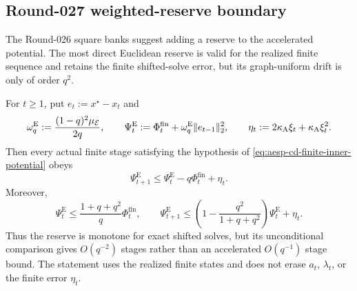 \subsection{Round-027 weighted-reserve boundary}

The Round-026 square banks suggest adding a reserve to the accelerated
potential.  The most direct Euclidean reserve is valid for the realized finite
sequence and retains the finite shifted-solve error, but its graph-uniform
drift is only of order $q^2$.

\begin{lemma}
\label{lem:aesp-cd-q-weighted-euclidean-reserve}
For $t\geq1$, put $e_t:=x^\star-x_t$ and
\begin{equation*}
 \omega_q^{\mathrm E}
 :=\frac{(1-q)^2\mu_{\mathcal E}}{2q},
 \qquad
 \Psi_t^{\mathrm E}
 :=\Phi_t^{\mathrm{fin}}
   +\omega_q^{\mathrm E}\lVert e_{t-1}\rVert_2^2,
 \qquad
 \eta_t:=2\kappa_{\mathrm A}\xi_t
          +\kappa_{\mathrm A}\xi_t^2.
\end{equation*}
Then every actual finite stage satisfying the hypothesis of
\cref{eq:aesp-cd-finite-inner-potential} obeys
\begin{equation}
 \Psi_{t+1}^{\mathrm E}
 \leq \Psi_t^{\mathrm E}-q\Phi_t^{\mathrm{fin}}+\eta_t.
 \label{eq:aesp-cd-q-weighted-euclidean-reserve}
\end{equation}
Moreover,
\begin{equation}
 \Psi_t^{\mathrm E}
 \leq\frac{1+q+q^2}{q}\Phi_t^{\mathrm{fin}},
 \qquad
 \Psi_{t+1}^{\mathrm E}
 \leq
 \left(1-\frac{q^2}{1+q+q^2}\right)\Psi_t^{\mathrm E}
 +\eta_t.
 \label{eq:aesp-cd-q-weighted-euclidean-drift}
\end{equation}
Thus the reserve is monotone for exact shifted solves, but its unconditional
comparison gives $O(q^{-2})$ stages rather than an accelerated
$O(q^{-1})$ stage bound.  The statement uses the realized finite states and
does not erase $a_t$, $\lambda_t$, or the finite error $\eta_t$.
\end{lemma}

